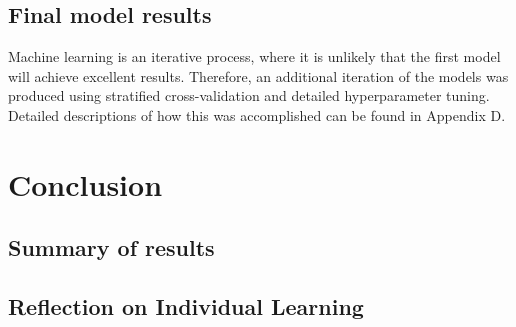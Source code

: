 \documentclass[12pt]{report}
\begin{document}

\section{Final model results}
Machine learning is an iterative process, where it is unlikely that the first model will achieve excellent results.
Therefore, an additional iteration of the models was produced using stratified cross-validation and detailed hyperparameter tuning.
Detailed descriptions of how this was accomplished can be found in Appendix D.




\chapter{Conclusion}






\section{Summary of results} 

\section{Reflection on Individual Learning}
\end{document}
